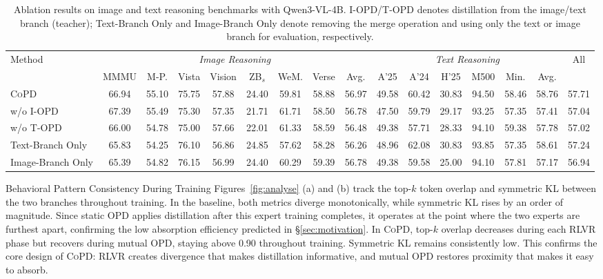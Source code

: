 \documentclass{llmxive}
\providecommand{\method}{\textsc{CoPD}\xspace}
\providecommand{\arraystretch}{0.95}
\begin{document}
\begin{table}[t]
\centering
\scriptsize
\setlength{\tabcolsep}{3.2pt}
\begin{tabular}{l cccccccc cccccc c}
\toprule
\multirow{2}{*}{Method}
& \multicolumn{8}{c}{\textit{Image Reasoning}}
& \multicolumn{6}{c}{\textit{Text Reasoning}}
& \multirow{2}{*}{All} \\
\cmidrule(lr){2-9} \cmidrule(lr){10-15}
& MMMU & M-P. & Vista & Vision & ZB$_s$ & WeM. & Verse & Avg.
& A'25 & A'24 & H'25 & M500 & Min. & Avg.
& \\
\midrule
\method
& 66.94 & 55.10 & 75.75 & 57.88 & 24.40 & 59.81 & 58.88 & \cellcolor{blue!5}56.97
& 49.58 & 60.42 & 30.83 & 94.50 & 58.46 & \cellcolor{blue!5}58.76
& \cellcolor{blue!5}57.71 \\

w/o I-OPD
& 67.39 & 55.49 & 75.30 & 57.35 & 21.71 & 61.71 & 58.50 & \cellcolor{blue!5}56.78
& 47.50 & 59.79 & 29.17 & 93.25 & 57.35 & \cellcolor{blue!5}57.41
& \cellcolor{blue!5}57.04 \\

w/o T-OPD
& 66.00 & 54.78 & 75.00 & 57.66 & 22.01 & 61.33 & 58.59 & \cellcolor{blue!5}56.48
& 49.38 & 57.71 & 28.33 & 94.10 & 59.38 & \cellcolor{blue!5}57.78
& \cellcolor{blue!5}57.02 \\

Text-Branch Only
& 65.83 & 54.25 & 76.10 & 56.86 & 24.85 & 57.62 & 58.28 & \cellcolor{blue!5}56.26
& 48.96 & 62.08 & 30.83 & 93.85 & 57.35 & \cellcolor{blue!5}58.61
& \cellcolor{blue!5}57.24 \\

Image-Branch Only
& 65.39 & 54.82 & 76.15 & 56.99 & 24.40 & 60.29 & 59.39 & \cellcolor{blue!5}56.78
& 49.38 & 59.58 & 25.00 & 94.10 & 57.81 & \cellcolor{blue!5}57.17
& \cellcolor{blue!5}56.94 \\
\bottomrule
\end{tabular}
\caption{Ablation results on image and text reasoning benchmarks with Qwen3-VL-4B. I-OPD/T-OPD denotes distillation from the image/text branch (teacher); Text-Branch Only and Image-Branch Only denote removing the merge operation and using only the text or image branch for evaluation, respectively.}
\label{tab:ablation_results}
\end{table}

{Behavioral Pattern Consistency During Training}
Figures~\ref{fig:analyse} (a) and (b) track the top-$k$ token overlap and symmetric KL between the two branches throughout training. In the baseline, both metrics diverge monotonically, while symmetric KL rises by an order of magnitude. Since static OPD applies distillation after this expert training completes, it operates at the point where the two experts are furthest apart, confirming the low absorption efficiency predicted in \S\ref{sec:motivation}. In \method, top-$k$ overlap decreases during each RLVR phase but recovers during mutual OPD, staying above 0.90 throughout training. Symmetric KL remains consistently low. This confirms the core design of \method: RLVR creates divergence that makes distillation informative, and mutual OPD restores proximity that makes it easy to absorb.
\end{document}
